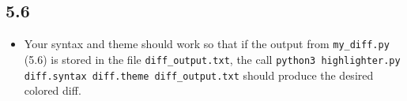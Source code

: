 \documentclass[english]{article}
\begin{document}
\subsection{5.6}
\begin{itemize}
\item Your syntax and theme should work so that if the output from \texttt{my\_diff.py} (5.6) is stored in the file \texttt{diff\_output.txt}, the call \texttt{python3 highlighter.py diff.syntax diff.theme diff\_output.txt} should produce the desired colored diff.
\end{itemize}
\end{document}
